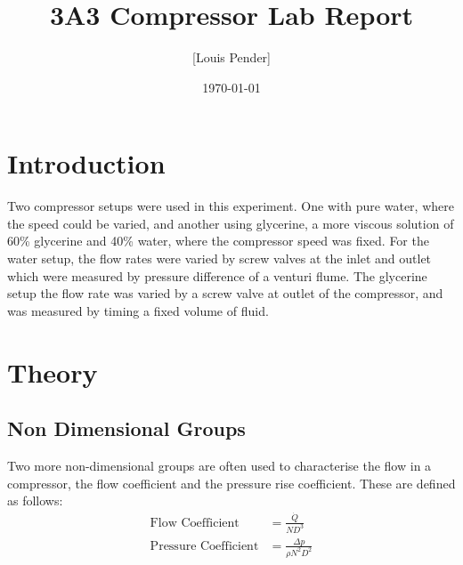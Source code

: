 \documentclass{article}
\title{3A3 Compressor Lab Report}
\author{[Louis Pender]}
\date{\today}
\begin{document}
\maketitle

\section{Introduction}

Two compressor setups were used in this experiment.
One with pure water, where the speed could be varied, and another using glycerine, a more viscous solution of 60\%
glycerine and 40\% water, where the compressor speed was fixed.
For the water setup, the flow rates were varied by screw valves at the inlet and outlet which were measured by pressure difference of a venturi flume.
The glycerine setup the flow rate was varied by a screw valve at outlet of the compressor, and was measured by timing a fixed volume of fluid.

\section{Theory}





\subsection{Non Dimensional Groups}


Two more non-dimensional groups are often used to characterise the flow in a compressor, the flow coefficient and the pressure rise coefficient.
These are defined as follows:
\begin{align}
    \text{Flow Coefficient} &= \frac{\dot{Q}}{ND^3} \label{eq:flow_coeff}\\
    \text{Pressure Coefficient} &= \frac{\Delta p}{\rho N^2 D^2} \label{eq:pressure_coeff}
\end{align}
\end{document}
